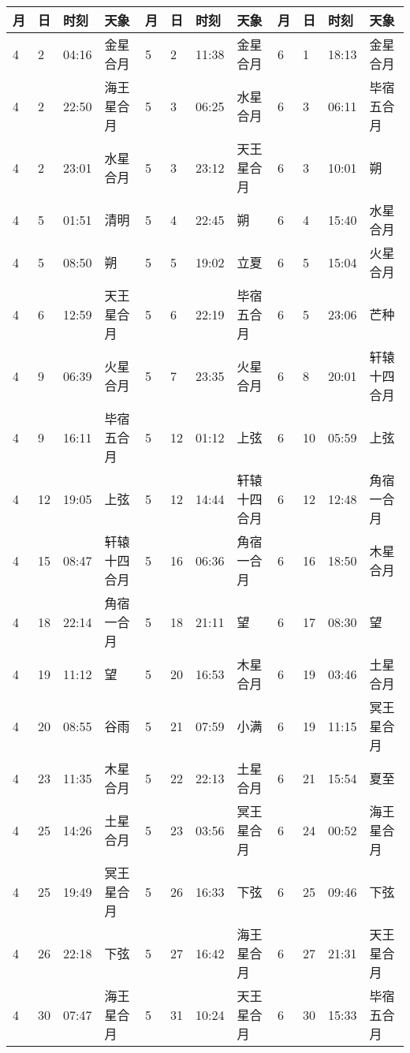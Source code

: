 \begin{tabular}{llll|llll|llll}
\hline
	月 & 日 & 时刻 & 天象 &         %
	月 & 日 & 时刻 & 天象 &
	月 & 日 & 时刻 & 天象 \tabularnewline
\hline
4 & 2 & 04:16 & 金星合月 & 5 & 2 & 11:38 & 金星合月 & 6 & 1 & 18:13 & 金星合月 \tabularnewline
4 & 2 & 22:50 & 海王星合月 & 5 & 3 & 06:25 & 水星合月 & 6 & 3 & 06:11 & 毕宿五合月 \tabularnewline
4 & 2 & 23:01 & 水星合月 & 5 & 3 & 23:12 &  天王星合月 & 6 & 3 & 10:01 & 朔 \tabularnewline
4 & 5 & 01:51 & 清明 & 5 & 4 & 22:45 & 朔 & 6 & 4 & 15:40 & 水星合月 \tabularnewline
4 & 5 & 08:50 & 朔 & 5 & 5 & 19:02 & 立夏 & 6 & 5 & 15:04 & 火星合月 \tabularnewline
4 & 6 & 12:59 &  天王星合月 & 5 & 6 & 22:19 & 毕宿五合月 & 6 & 5 & 23:06 & 芒种 \tabularnewline
4 & 9 & 06:39 & 火星合月 & 5 & 7 & 23:35 & 火星合月 & 6 & 8 & 20:01 & 轩辕十四合月 \tabularnewline
4 & 9 & 16:11 & 毕宿五合月 & 5 & 12 & 01:12 & 上弦 & 6 & 10 & 05:59 & 上弦 \tabularnewline
4 & 12 & 19:05 & 上弦 & 5 & 12 & 14:44 & 轩辕十四合月 & 6 & 12 & 12:48 & 角宿一合月 \tabularnewline
4 & 15 & 08:47 & 轩辕十四合月 & 5 & 16 & 06:36 & 角宿一合月 & 6 & 16 & 18:50 & 木星合月 \tabularnewline
4 & 18 & 22:14 & 角宿一合月 & 5 & 18 & 21:11 & 望 & 6 & 17 & 08:30 & 望 \tabularnewline
4 & 19 & 11:12 & 望 & 5 & 20 & 16:53 & 木星合月 & 6 & 19 & 03:46 & 土星合月 \tabularnewline
4 & 20 & 08:55 & 谷雨 & 5 & 21 & 07:59 & 小满 & 6 & 19 & 11:15 & 冥王星合月 \tabularnewline
4 & 23 & 11:35 & 木星合月 & 5 & 22 & 22:13 & 土星合月 & 6 & 21 & 15:54 & 夏至 \tabularnewline
4 & 25 & 14:26 & 土星合月 & 5 & 23 & 03:56 & 冥王星合月 & 6 & 24 & 00:52 & 海王星合月 \tabularnewline
4 & 25 & 19:49 & 冥王星合月 & 5 & 26 & 16:33 & 下弦 & 6 & 25 & 09:46 & 下弦 \tabularnewline
4 & 26 & 22:18 & 下弦 & 5 & 27 & 16:42 & 海王星合月 & 6 & 27 & 21:31 &  天王星合月 \tabularnewline
4 & 30 & 07:47 & 海王星合月 & 5 & 31 & 10:24 &  天王星合月 & 6 & 30 & 15:33 & 毕宿五合月 \tabularnewline
\hline \end{tabular}

